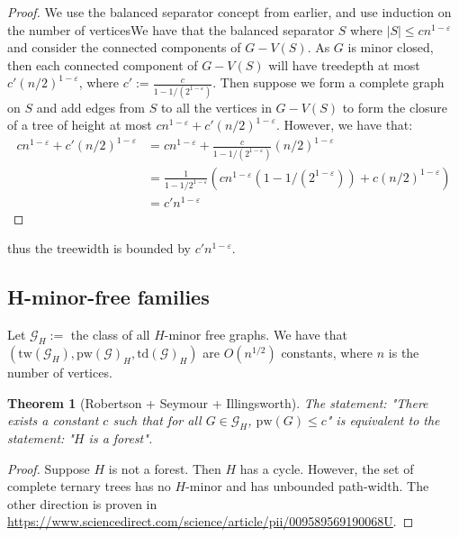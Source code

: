 \documentclass[]{article}
\newcommand{\tw}{\text{tw}}
\newcommand{\pw}{\text{pw}}
\newcommand{\td}{\text{td}}
\newtheorem{theorem}{Theorem}
\theoremstyle{definition}
\numberwithin{theorem}{section}
\numberwithin{equation}{section}
\begin{document}
\begin{proof}
	We use the balanced separator concept from earlier, and use induction on the number of verticesWe have that the balanced separator $S$ where $|S| \leq cn^{1-\varepsilon}$ and consider the connected components of $G - V(S)$. As $G$ is minor closed, then each connected component of $G - V(S)$ will have treedepth at most $c'(n/2)^{1 - \varepsilon}$, where $c' := \frac{c}{1 - 1/(2^{1-\varepsilon})}$. Then suppose we form a complete graph on $S$ and add edges from $S$ to all the vertices in $G - V(S)$ to form the closure of a tree of height at most $c n^{1 - \varepsilon} + c'(n/2)^{1 - \varepsilon}$. However, we have that:
	\begin{align*}
		c n^{1 - \varepsilon} + c'(n/2)^{1 - \varepsilon} &= c n^{1 - \varepsilon} + \frac{c}{1 - 1/(2^{1-\varepsilon})}(n/2)^{1 - \varepsilon}\\
		&= \frac{1}{1 - 1/2^{1-\varepsilon}} (c n^{1 - \varepsilon}(1 - 1/(2^{1-\varepsilon})) + c (n/2)^{1 - \varepsilon})\\
		&= c'n^{1 - \varepsilon}
	\end{align*}
\end{proof}
thus the treewidth is bounded by $c' n^{1-\varepsilon}$. 

\subsection{H-minor-free families}
Let $\mathcal{G}_H:=$ the class of all $H$-minor free graphs.
We have that $(\tw(\mathcal{G}_H), \pw(\mathcal{G})_H, \td(\mathcal{G})_H)$ are $O(n^{1/2})$ constants, where $n$ is the number of vertices. 
\begin{theorem}[Robertson + Seymour + Illingsworth]
	The statement: "There exists a constant $c$ such that for all $G \in \mathcal{G}_H$, $\pw(G) \leq c$" is equivalent to the statement: "$H$ is a forest".
\end{theorem}

\begin{proof}
	Suppose $H$ is not a forest. Then $H$ has a cycle. However, the set of complete ternary trees has no $H$-minor and has unbounded path-width. The other direction is proven in \url{https://www.sciencedirect.com/science/article/pii/009589569190068U}. 
\end{proof}
\end{document}
